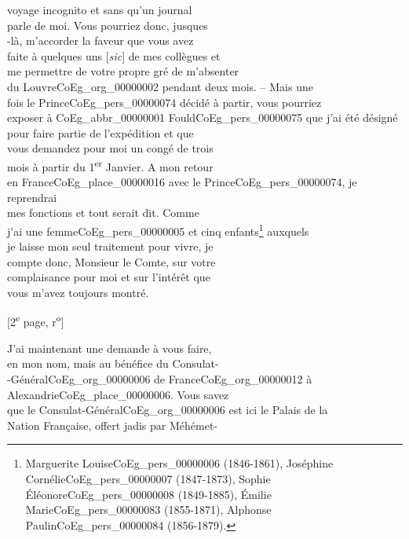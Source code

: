 \documentclass{book}
\begin{document}
{voyage incognito et sans qu’un journal\\
parle de moi. Vous pourriez donc, jusques\\
-là, m’accorder la faveur que vous avez\\
faite à quelques uns {[\textit{sic}]} de mes collègues et\\
me permettre de votre propre gré de m’absenter\\
du Louvre\gls{CoEg_org_00000002} pendant deux mois. – Mais une\\
fois le Prince\gls{CoEg_pers_00000074} décidé à partir, vous pourriez\\
exposer à \gls{CoEg_abbr_00000001} Fould\gls{CoEg_pers_00000075} que j’ai été désigné\\
pour faire partie de l’expédition et que\\
vous demandez pour moi un congé de trois\\
mois à partir du 1\textsuperscript{er} Janvier. A mon retour\\
en France\gls{CoEg_place_00000016} avec le Prince\gls{CoEg_pers_00000074}, je reprendrai\\
mes fonctions et tout serait dit. Comme\\
j’ai une femme\gls{CoEg_pers_00000005} et cinq enfants\footnote{Marguerite Louise\gls{CoEg_pers_00000006} (1846-1861), Joséphine Cornélie\gls{CoEg_pers_00000007} (1847-1873), Sophie Éléonore\gls{CoEg_pers_00000008} (1849-1885), Émilie Marie\gls{CoEg_pers_00000083} (1855-1871), Alphonse Paulin\gls{CoEg_pers_00000084} (1856-1879).} auxquels\\
je laisse mon seul traitement pour vivre, je\\
compte donc, Monsieur le Comte, sur votre\\
complaisance pour moi et sur l’intérêt que\\
vous m’avez toujours montré.
{\footnotesize\begin{center} {[2\textsuperscript{e} page, r\textsuperscript{o}]}\end{center}}
\indent J’ai maintenant une demande à vous faire,\\
en mon nom, mais au bénéfice du Consulat-\\
-Général\gls{CoEg_org_00000006} de France\gls{CoEg_org_00000012} à Alexandrie\gls{CoEg_place_00000006}. Vous savez\\
que le Consulat-Général\gls{CoEg_org_00000006} est ici le Palais de la\\
Nation Française, offert jadis par Méhémet-\\
}
\end{document}
